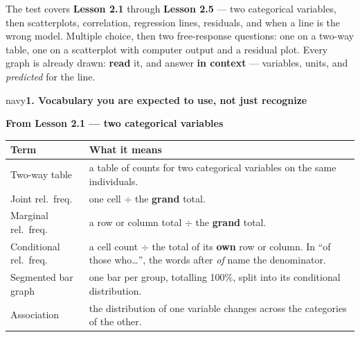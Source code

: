 \documentclass[12pt]{article}
\newcommand{\sghead}[2][10]{%
  \vspace{0.13in}
  \boxguard[#1]
  \begin{headlinebox}{navy}\color{white}\bfseries\small #2\end{headlinebox}
  \vspace{0.09in}}
\begin{document}

\vspace{0.12in}

\boxguard[8]
\begin{remindbox}
\small
The test covers \textbf{Lesson 2.1} through \textbf{Lesson 2.5} --- two categorical variables,
then scatterplots, correlation, regression lines, residuals, and when a line is the wrong
model. Multiple choice, then two free-response questions: one on a two-way table, one on a
scatterplot with computer output and a residual plot. Every graph is already drawn: \textbf{read}
it, and answer \textbf{in context} --- variables, units, and \emph{predicted} for the line.
\end{remindbox}

\sghead{1. Vocabulary you are expected to use, not just recognize}

\small
\renewcommand{\arraystretch}{1.15}

\textbf{From Lesson 2.1 --- two categorical variables}
\par\vspace{3pt}
\noindent\begin{tabularx}{\linewidth}{@{} l X @{}}
\rowcolor{sky}
\textbf{Term} & \textbf{What it means} \\
\midrule
Two-way table & a table of counts for two categorical variables on the same individuals. \\
Joint rel.\ freq. & one cell $\div$ the \textbf{grand} total. \\
Marginal rel.\ freq. & a row or column total $\div$ the \textbf{grand} total. \\
Conditional rel.\ freq. & a cell count $\div$ the total of its \textbf{own} row or column.
                   In ``of those who\ldots'', the words after \emph{of} name the denominator. \\
Segmented bar graph & one bar per group, totalling 100\%, split into its conditional distribution. \\
Association & the distribution of one variable changes across the categories of the other. \\
\end{tabularx}
\end{document}
